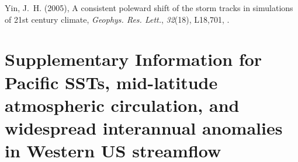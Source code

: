 \documentclass[final, double]{ua-thesis}
\begin{document}
\begin{thebibliography}{59}
Yin, J.~H. (2005), A consistent poleward shift of the storm tracks in
  simulations of 21st century climate, \textit{Geophys. Res. Lett.},
  \textit{32}(18), L18,701, .

\end{thebibliography}

\chapter{Supplementary Information for Pacific SSTs, mid-latitude atmospheric circulation, and widespread interannual anomalies in Western US streamflow}







\end{document}
